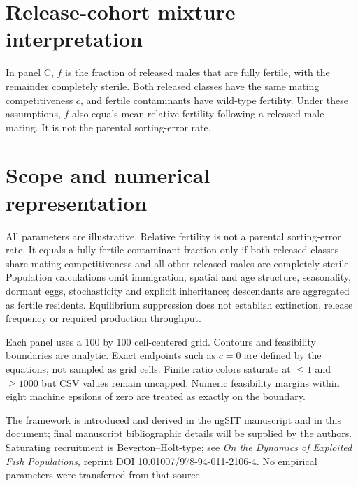 \documentclass[11pt]{article}
\begin{document}
\section*{Release-cohort mixture interpretation}
In panel C, $f$ is the fraction of released males that are fully fertile, with the remainder completely sterile. Both released classes have the same mating competitiveness $c$, and fertile contaminants have wild-type fertility. Under these assumptions, $f$ also equals mean relative fertility following a released-male mating. It is not the parental sorting-error rate.

\section*{Scope and numerical representation}
All parameters are illustrative. Relative fertility is not a parental sorting-error rate. It equals a fully fertile contaminant fraction only if both released classes share mating competitiveness and all other released males are completely sterile. Population calculations omit immigration, spatial and age structure, seasonality, dormant eggs, stochasticity and explicit inheritance; descendants are aggregated as fertile residents. Equilibrium suppression does not establish extinction, release frequency or required production throughput.

Each panel uses a 100 by 100 cell-centered grid. Contours and feasibility boundaries are analytic. Exact endpoints such as $c=0$ are defined by the equations, not sampled as grid cells. Finite ratio colors saturate at $\leq1$ and $\geq1000$ but CSV values remain uncapped. Numeric feasibility margins within eight machine epsilons of zero are treated as exactly on the boundary.

The framework is introduced and derived in the ngSIT manuscript and in this document; final manuscript bibliographic details will be supplied by the authors. Saturating recruitment is Beverton--Holt-type; see \emph{On the Dynamics of Exploited Fish Populations}, reprint DOI 10.01007/978-94-011-2106-4. No empirical parameters were transferred from that source.
\end{document}
